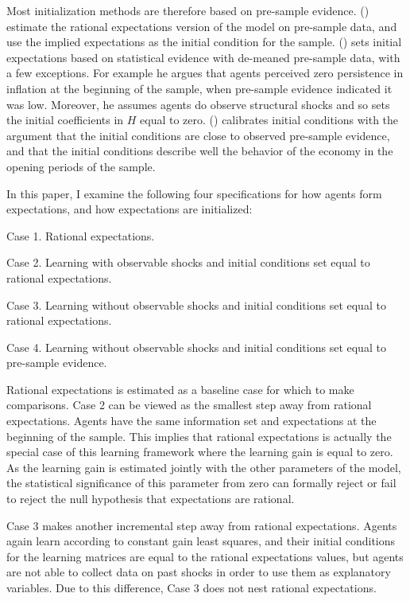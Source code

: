 \documentclass[11pt]{article}
\newcommand{\bd}{\begin{description}}
\newcommand{\ed}{\end{description}}
\newcommand{\citee}[1]{\citeauthor*{#1} (\citeyear{#1})}
\begin{document}
Most initialization methods are therefore based on pre-sample evidence.  \citee{slobodyan_wouters2007} estimate the rational expectations version of the model on pre-sample data, and use the implied expectations as the initial condition for the sample.  \citee{milani2007} sets initial expectations based on statistical evidence with de-meaned pre-sample data, with a few exceptions.  For example he argues that agents perceived zero persistence in inflation at the beginning of the sample, when pre-sample evidence indicated it was low.  Moreover, he assumes agents do observe structural shocks and so sets the initial coefficients in $H$ equal to zero.  \citee{primiceri2006} calibrates initial conditions with the argument that the initial conditions are close to observed pre-sample evidence, and that the initial conditions describe well the behavior of the economy in the opening periods of the sample.  

In this paper, I examine the following four specifications for how agents form expectations, and how expectations are initialized:
\bd
\item Case 1.  Rational expectations.  
\item Case 2.  Learning with observable shocks and initial conditions set equal to rational expectations.
\item Case 3.  Learning without observable shocks and initial conditions set equal to rational expectations.
\item Case 4.  Learning without observable shocks and initial conditions set equal to pre-sample evidence.
\ed

Rational expectations is estimated as a baseline case for which to make comparisons.  Case 2 can be viewed as the smallest step away from rational expectations.  Agents have the same information set and expectations at the beginning of the sample.  This implies that rational expectations is actually the special case of this learning framework where the learning gain is equal to zero.  As the learning gain is estimated jointly with the other parameters of the model, the statistical significance of this parameter from zero can formally reject or fail to reject the null hypothesis that expectations are rational.

Case 3 makes another incremental step away from rational expectations.  Agents again learn according to constant gain least squares, and their initial conditions for the learning matrices are equal to the rational expectations values, but agents are not able to collect data on past shocks in order to use them as explanatory variables.  Due to this difference, Case 3 does not nest rational expectations.
\end{document}
